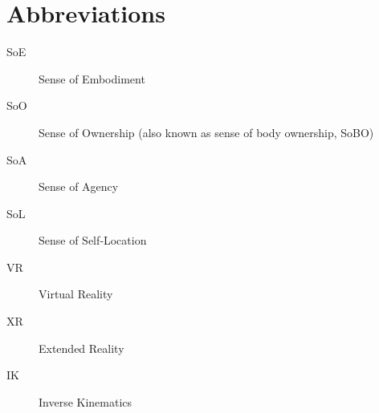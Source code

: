 
\chapter*{Abbreviations}


\begin{description}
  \item[SoE] Sense of Embodiment
  \item[SoO] Sense of Ownership (also known as sense of body ownership, SoBO)
  \item[SoA] Sense of Agency
  \item[SoL] Sense of Self‑Location
  \item[VR] Virtual Reality
  \item[XR] Extended Reality
  \item[IK] Inverse Kinematics
\end{description}
